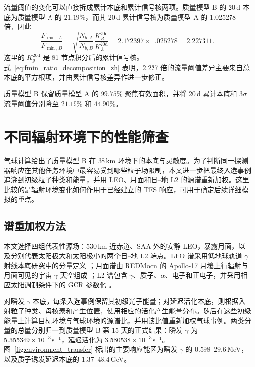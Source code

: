\documentclass[11pt]{article}
\newcommand{\revblue}[1]{\textcolor{revisionblue}{#1}}
\newcommand{\cps}{\,\mathrm{s^{-1}}}
\begin{document}
\FloatBarrier

流量阈值的变化可以直接拆成累计本底和累计信号核两项。质量模型 B 的 20\,d 本底为质量模型 A 的 $21.19\%$，而其 20\,d 累计信号核为质量模型 A 的 1.025278 倍，因此
\begin{equation}
 \frac{F_{\min,A}}{F_{\min,B}}
 =\sqrt{\frac{N_{b,A}}{N_{b,B}}}\frac{K_B^{20\mathrm d}}{K_A^{20\mathrm d}}
 =2.172397\times1.025278
 =2.227311 .
 \label{eq:fmin_ratio_decomposition_zh}
\end{equation}
这里的 $K_g^{20\mathrm d}$ 是 81 节点积分后的累计信号核。式~\eqref{eq:fmin_ratio_decomposition_zh} 表明，2.227 倍的流量阈值差异主要来自总本底的平方根项，并由累计信号核差异作进一步修正。

质量模型 B 保留质量模型 A 的 $99.75\%$ 聚焦有效面积，并将 20\,d 累计本底和 $3\sigma$ 流量阈值分别降至 $21.19\%$ 和 $44.90\%$。

\FloatBarrier

\section{不同辐射环境下的性能筛查}
\label{sec:environment_screening}

气球计算给出了质量模型 B 在 38\,km 环境下的本底与灵敏度。为了判断同一探测器响应在其他任务环境中最容易受到哪些粒子场限制，本文进一步把最终入选事例追溯到初级粒子种类和能量，并用 LEO、月面和日--地 L2 的源谱重新加权。这里比较的是辐射环境变化如何作用于已经建立的 TES 响应，可用于确定后续详细模拟的重点。

\subsection{谱重加权方法}

本文选择四组代表性源场：530\,km 近赤道、SAA 外的安静 LEO，暴露月面，以及分别代表太阳极大和太阳极小的两个日--地 L2 端点。LEO 谱采用低地球轨道 $\gamma$ 射线本底研究中的分量定义 \cite{Cumani2019LEO}；月面谱由 REDMoon 的 Apollo-17 月壤上行辐射与月面可见的宇宙 $\gamma$ 天空组成 \cite{Dobynde2021REDMoon}；L2 谱包含 $\gamma$、质子、$\alpha$、电子和正电子，并采用相应太阳调制条件下的 GCR 参数化 \cite{Lotti2021Athena,Usoskin2005,Kuznetsov2017}。

对\revblue{瞬发 $\gamma$ 本底}，每条入选事例保留其初级光子能量；对延迟活化本底，则根据入射粒子种类、母核素和产生位置，使用相应的活化产生能量分布。随后在这些初级能量上计算目标环境与气球环境的源谱比，并用该比值重新加权气球事例。两类分量的总量分别归一到质量模型 B 第 15 天的正式结果：\revblue{瞬发 $\gamma$} 为 $5.355349\times10^{-3}\cps$，延迟活化为 $3.580538\times10^{-3}\cps$。图~\ref{fig:environment_transfer} 标出的主要响应能区为瞬发 $\gamma$ 的 $0.598$--$29.6$\,MeV，以及质子诱发延迟本底的 $1.37$--$48.4$\,GeV。
\end{document}
